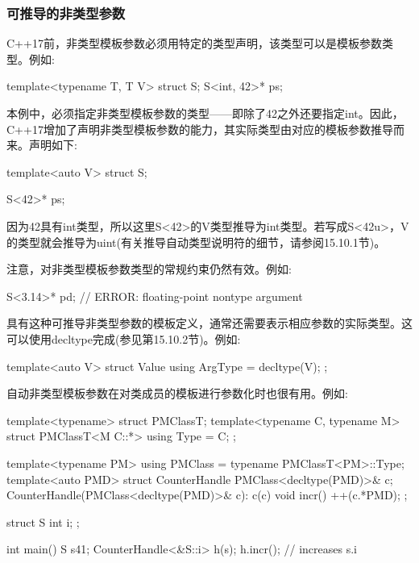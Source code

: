 \subsubsection{可推导的非类型参数}

C++17前，非类型模板参数必须用特定的类型声明，该类型可以是模板参数类型。例如:

\begin{cpp}
template<typename T, T V> struct S;
S<int, 42>* ps;
\end{cpp}

本例中，必须指定非类型模板参数的类型——即除了42之外还要指定int。因此，C++17增加了声明非类型模板参数的能力，其实际类型由对应的模板参数推导而来。声明如下:

\begin{cpp}
template<auto V> struct S;
\end{cpp}


\begin{cpp}
S<42>* ps;
\end{cpp}

因为42具有int类型，所以这里S<42>的V类型推导为int类型。若写成S<42u>，V的类型就会推导为uint(有关推导自动类型说明符的细节，请参阅15.10.1节)。

注意，对非类型模板参数类型的常规约束仍然有效。例如:

\begin{cpp}
S<3.14>* pd; // ERROR: floating-point nontype argument
\end{cpp}

具有这种可推导非类型参数的模板定义，通常还需要表示相应参数的实际类型。这可以使用decltype完成(参见第15.10.2节)。例如:

\begin{cpp}
template<auto V> struct Value {
	using ArgType = decltype(V);
};
\end{cpp}

自动非类型模板参数在对类成员的模板进行参数化时也很有用。例如:

\begin{cpp}
template<typename> struct PMClassT;
template<typename C, typename M> struct PMClassT<M C::*> {
	using Type = C;
};

template<typename PM> using PMClass = typename PMClassT<PM>::Type;
template<auto PMD> struct CounterHandle {
	PMClass<decltype(PMD)>& c;
	CounterHandle(PMClass<decltype(PMD)>& c): c(c) {
	}
	void incr() {
		++(c.*PMD);
	}
};

struct S {
	int i;
};

int main() {
	S s{41};
	CounterHandle<&S::i> h(s);
	h.incr(); // increases s.i
}
\end{cpp}

